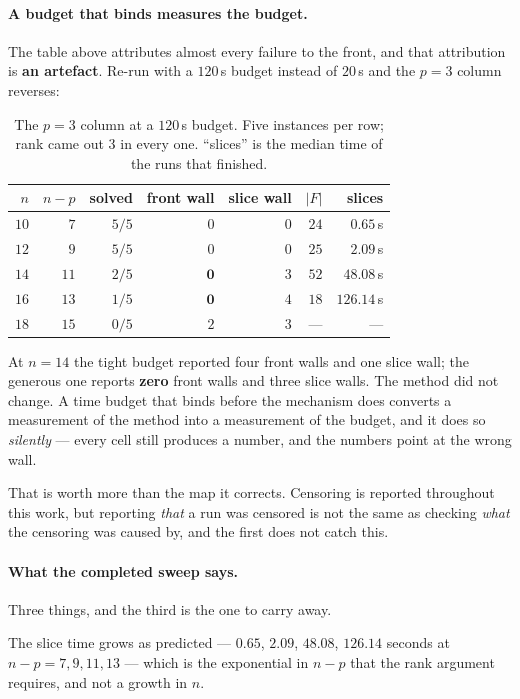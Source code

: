 \documentclass[11pt,a4paper]{article}
\begin{document}
\paragraph{A budget that binds measures the budget.}
The table above attributes almost every failure to the front, and that
attribution is \textbf{an artefact}.  Re-run with a $120$\,s budget instead of
$20$\,s and the $p=3$ column reverses:

\begin{table}[h]
\centering
\caption{The $p=3$ column at a $120$\,s budget.  Five instances per row; rank
came out $3$ in every one.  ``slices'' is the median time of the runs that
finished.}
\label{tab:walls120}
\begin{tabular}{rrrrrrr}
\toprule
$n$ & $n-p$ & solved & front wall & slice wall & $|F|$ & slices \\
\midrule
$10$ & $7$ & $5/5$ & $0$ & $0$ & $24$ & $0.65$\,s \\
$12$ & $9$ & $5/5$ & $0$ & $0$ & $25$ & $2.09$\,s \\
$14$ & $11$ & $2/5$ & $\mathbf{0}$ & $3$ & $52$ & $48.08$\,s \\
$16$ & $13$ & $1/5$ & $\mathbf{0}$ & $4$ & $18$ & $126.14$\,s \\
$18$ & $15$ & $0/5$ & $2$ & $3$ & --- & --- \\
\bottomrule
\end{tabular}
\end{table}

\noindent
At $n=14$ the tight budget reported four front walls and one slice wall; the
generous one reports \textbf{zero} front walls and three slice walls.  The
method did not change.  A time budget that binds before the mechanism does
converts a measurement of the method into a measurement of the budget, and it
does so \emph{silently} --- every cell still produces a number, and the numbers
point at the wrong wall.

That is worth more than the map it corrects.  Censoring is reported throughout
this work, but reporting \emph{that} a run was censored is not the same as
checking \emph{what} the censoring was caused by, and the first does not catch
this.

\paragraph{What the completed sweep says.}
Three things, and the third is the one to carry away.

The slice time grows as predicted --- $0.65$, $2.09$, $48.08$, $126.14$
seconds at $n-p = 7, 9, 11, 13$ --- which is the exponential in $n-p$ that the
rank argument requires, and not a growth in $n$.
\end{document}
